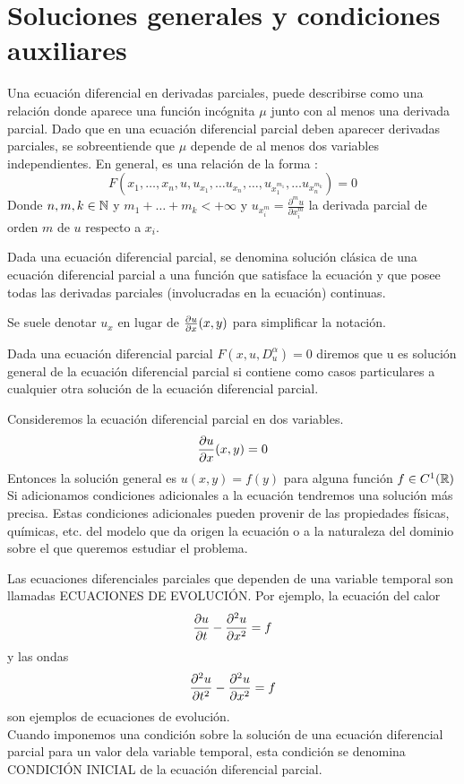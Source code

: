 \section{Soluciones generales y condiciones auxiliares}
\begin{Def}
    Una ecuación diferencial en derivadas parciales, puede describirse como una relación donde aparece una función incógnita $\mu$ junto con al menos una derivada parcial. Dado que en una ecuación diferencial parcial deben aparecer derivadas parciales, se sobreentiende que $\mu$ depende de al menos dos variables independientes. En general, es una relación de la forma :
    $$F(x_1,\ldots,x_n, u, u_{x_1},\ldots u_{x_n},\ldots,u_{x^{m_1}_1},\ldots u_{x^{m_k}_n} )=0$$
    Donde $n,m,k \in{\mathbb{N}}$ y $m_1+\ldots+m_k<+\infty$ y $u_{x^{m}_i}=\frac{\partial^{m} u}{\partial x_i^m}$ la derivada parcial de orden $m$ de $u$ respecto a $x_i$.
\end{Def}
\begin{Def}
    Dada una ecuación diferencial parcial, se denomina solución clásica de una ecuación diferencial parcial a una función que satisface la ecuación y que posee todas las derivadas parciales (involucradas en la ecuación) continuas.
\end{Def}
\begin{Obs}
    Se suele denotar $u_x$ en lugar de $\frac{\partial u}{\partial x}(x,y)$ para simplificar la notación.
\end{Obs}
Dada una ecuación diferencial parcial $F(x,u,D^{\alpha}_u)=0$ diremos que u es solución general de la ecuación diferencial parcial si contiene como casos particulares a cualquier otra solución de la ecuación diferencial parcial.
\begin{Ejm}
    Consideremos la ecuación diferencial parcial en dos variables.
    $$\frac{\partial u}{\partial x}(x,y)=0$$
    Entonces la solución general es $u(x,y)=f(y)$ para alguna función $f\in C^1({\mathbb{R}})$\\
    Si adicionamos condiciones adicionales a la ecuación tendremos una solución más precisa. Estas condiciones adicionales pueden provenir de las propiedades físicas, químicas, etc. del modelo que da origen la ecuación o a la naturaleza del dominio sobre el que queremos estudiar el problema.
\end{Ejm}
Las ecuaciones diferenciales parciales que dependen de una variable temporal son llamadas ECUACIONES DE EVOLUCIÓN. Por ejemplo, la ecuación del calor  $$\frac{\partial u}{\partial t}-\frac{\partial^2u}{\partial x^2}=f$$ y las ondas $$\frac{\partial^2u}{\partial t^2}-\frac{\partial^2u}{\partial x^2}=f$$ son ejemplos de ecuaciones de evolución.\\Cuando imponemos una condición sobre la solución de una ecuación diferencial parcial para un valor dela variable temporal, esta condición se denomina CONDICIÓN INICIAL de la ecuación diferencial parcial.